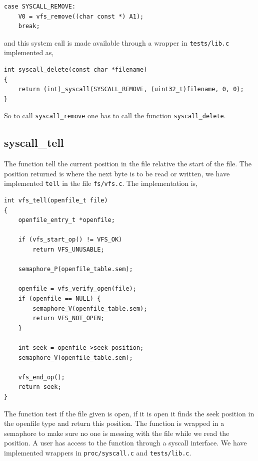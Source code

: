 \documentclass[11pt]{article}
\begin{document}
\begin{lstlisting}[style=customc]
case SYSCALL_REMOVE:
    V0 = vfs_remove((char const *) A1);
    break;
\end{lstlisting}

and this system call is made available through a wrapper in \texttt{tests/lib.c}
implemented as,

\begin{lstlisting}[style=customc]
int syscall_delete(const char *filename)
{
    return (int)_syscall(SYSCALL_REMOVE, (uint32_t)filename, 0, 0);
}
\end{lstlisting}

So to call \texttt{syscall\_remove} one has to call the function
\texttt{syscall\_delete}.

\subsection{syscall\_tell}
The function tell the current position in the file relative the start of the
file.  The position returned is where the next byte is to be read or written,
we have implemented \texttt{tell} in the file \texttt{fs/vfs.c}.  The
implementation is,

\begin{lstlisting}[style=customc]
int vfs_tell(openfile_t file)
{
    openfile_entry_t *openfile;

    if (vfs_start_op() != VFS_OK)
        return VFS_UNUSABLE;

    semaphore_P(openfile_table.sem);

    openfile = vfs_verify_open(file);
    if (openfile == NULL) {
        semaphore_V(openfile_table.sem);
        return VFS_NOT_OPEN;
    }

    int seek = openfile->seek_position;
    semaphore_V(openfile_table.sem);

    vfs_end_op();
    return seek;
}
\end{lstlisting}

The function test if the file given is open, if it is open it finds the seek
position in the openfile type and return this position.  The function is
wrapped in a semaphore to make sure no one is messing with the file while we
read the position.  A user has access to the function through a syscall
interface.  We have implemented wrappers in \texttt{proc/syscall.c} and
\texttt{tests/lib.c}.
\end{document}
